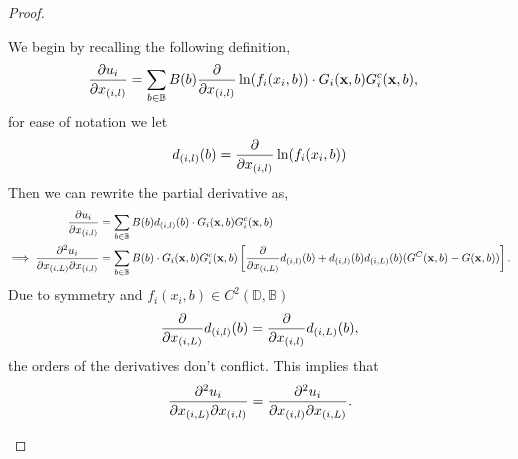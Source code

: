 \documentclass{article}
\newcommand {\D}{\mathbb{D}}
\newcommand {\B}{\mathbb{B}}
\begin{document}
\begin{proof}
\begin{enumerate}
                    
                    We begin by recalling the following definition, 
                    \begin{align}
                        \pdv{u_i}{x_{(i,l)}}&=\sum_{b\in\mathbb{B}} B(b)\pdv{}{x_{(i,l)}}\ln(f_i(x_i,b)) \cdot G_i(\mathbf{x},b) G_i^c(\mathbf{x},b),
                    \end{align}
                    for ease of notation we let
                    \begin{equation}
                        d_{(i,l)}(b)=\pdv{}{x_{(i,l)}}\ln(f_i(x_i,b))
                    \end{equation}
                    Then we can rewrite the partial derivative as, 
                    \begin{align}
                        \pdv{u_i}{x_{(i,l)}}&=\sum_{b\in\mathbb{B}} B(b) d_{(i,l)}(b)\cdot G_i(\mathbf{x},b) G_i^c(\mathbf{x},b) \\ %
                        \implies \pdv[2]{u_i}{x_{(i,L)}}{x_{(i,l)}}&=\sum_{b\in\mathbb{B}} B(b)\cdot G_i(\mathbf{x},b) G_i^c(\mathbf{x},b)\left[\pdv{}{x_{(i,L)}} d_{(i,l)}(b)+ d_{(i,l)}(b) d_{(i,L)}(b)(G^C(\mathbf{x},b) -G(\mathbf{x},b) )\right] \label{eq:SI_jacobians_A}.
                    \end{align}
                    Due to symmetry and $f_{i}(x_i,b)\in C^2(\D,\B)$ 
                    \begin{align}
                        \pdv{}{x_{(i,L)}} d_{(i,l)}(b) = \pdv{}{x_{(i,l)}} d_{(i,L)}(b),
                    \end{align}
                    the orders of the derivatives don't conflict. This implies that 
                    \begin{equation}
                        \pdv[2]{u_i}{x_{(i,L)}}{x_{(i,l)}}=\pdv[2]{u_i}{x_{(i,l)}}{x_{(i,L)}}.
                    \end{equation}


\end{enumerate}
\end{proof}
\end{document}
